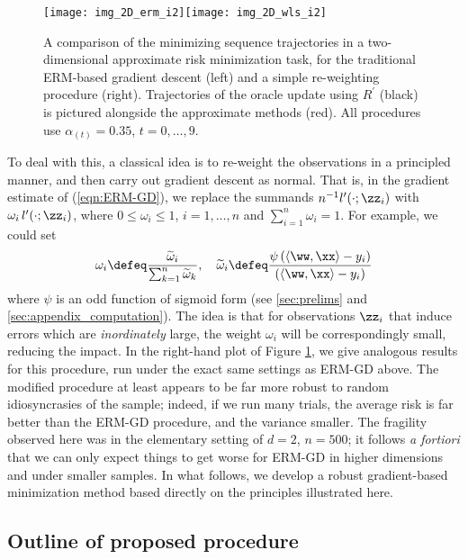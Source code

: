 \documentclass[11pt,oneside]{article}
\theoremstyle{definition} \newtheorem{defn}{Definition}       %
\theoremstyle{plain} \newtheorem{prop}[defn]{Proposition}           %
\theoremstyle{plain} \newtheorem{thm}[defn]{Theorem}                %
\theoremstyle{plain} \newtheorem{lem}[defn]{Lemma}                  %
\theoremstyle{plain} \newtheorem{cor}[defn]{Corollary}              %
\theoremstyle{remark} \newtheorem{rmk}[defn]{Remark}                %
\theoremstyle{remark} \newtheorem{ex}[defn]{Example}                %
\begin{document}
\begin{figure}[t]
\centering
\texttt{[image: img\_2D\_erm\_i2]}\texttt{[image: img\_2D\_wls\_i2]}
\caption{A comparison of the minimizing sequence trajectories in a two-dimensional approximate risk minimization task, for the traditional ERM-based gradient descent (left) and a simple re-weighting procedure (right). Trajectories of the oracle update using $R^{\prime}$ (black) is pictured alongside the approximate methods (red). All procedures use $\alpha_{(t)}=0.35$, $t=0,\ldots,9$.}
\label{fig:2D_motivation}
\end{figure}


To deal with this, a classical idea is to re-weight the observations in a principled manner, and then carry out gradient descent as normal. That is, in the gradient estimate of (\ref{eqn:ERM-GD}), we replace the summands $n^{-1}l^{\prime}(\cdot;\zz_{i})$ with $\omega_{i}\,l^{\prime}(\cdot;\zz_{i})$, where $0 \leq \omega_{i} \leq 1$, $i = 1,\ldots,n$ and $\sum_{i=1}^{n}\omega_{i}=1$. For example, we could set
%
\begin{align*}
\omega_{i} \defeq \frac{\widetilde{\omega}_{i}}{\sum_{k=1}^{n}\widetilde{\omega}_{k}}, \quad \widetilde{\omega}_{i} \defeq \frac{\psi\left(\langle \ww, \xx \rangle - y_{i}\right)}{\left(\langle \ww, \xx \rangle - y_{i}\right)}
\end{align*}
%
where $\psi$ is an odd function of sigmoid form (see \ref{sec:prelims} and \ref{sec:appendix_computation}). The idea is that for observations $\zz_{i}$ that induce errors which are \textit{inordinately} large, the weight $\omega_{i}$ will be correspondingly small, reducing the impact. In the right-hand plot of Figure \ref{fig:2D_motivation}, we give analogous results for this procedure, run under the exact same settings as ERM-GD above. The modified procedure at least appears to be far more robust to random idiosyncrasies of the sample; indeed, if we run many trials, the average risk is far better than the ERM-GD procedure, and the variance smaller. The fragility observed here was in the elementary setting of $d=2$, $n=500$; it follows \textit{a fortiori} that we can only expect things to get worse for ERM-GD in higher dimensions and under smaller samples. In what follows, we develop a robust gradient-based minimization method based directly on the principles illustrated here.


\subsection{Outline of proposed procedure}\label{sec:intuitive_algo}
\end{document}
